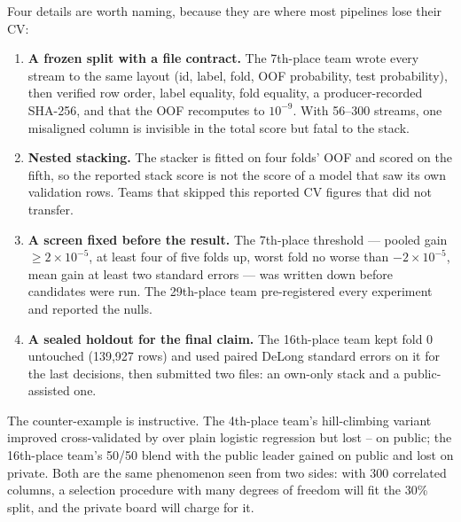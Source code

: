 Four details are worth naming, because they are where most pipelines lose their CV:

\begin{enumerate}
  \item \textbf{A frozen split with a file contract.} The 7th-place team wrote every stream
        to the same layout (id, label, fold, OOF probability, test probability), then
        verified row order, label equality, fold equality, a producer-recorded SHA-256, and
        that the OOF \auc{} recomputes to $10^{-9}$. With 56--300 streams, one misaligned
        column is invisible in the total score but fatal to the stack.
  \item \textbf{Nested stacking.} The stacker is fitted on four folds' OOF and scored on
        the fifth, so the reported stack score is not the score of a model that saw its own
        validation rows. Teams that skipped this reported CV figures that did not transfer.
  \item \textbf{A screen fixed before the result.} The 7th-place threshold --- pooled gain
        $\ge 2\times10^{-5}$, at least four of five folds up, worst fold no worse than
        $-2\times10^{-5}$, mean gain at least two standard errors --- was written down
        before candidates were run. The 29th-place team pre-registered every experiment and
        reported the nulls.
  \item \textbf{A sealed holdout for the final claim.} The 16th-place team kept fold 0
        untouched (139{,}927 rows) and used paired DeLong standard errors
        \citep{deLong1988} on it for the last decisions, then submitted two files: an
        own-only stack and a public-assisted one.
\end{enumerate}

The counter-example is instructive. The 4th-place team's hill-climbing variant improved
cross-validated \auc{} by  over plain logistic regression but lost --
on public; the 16th-place team's 50/50 blend with the public leader gained  on
public and lost  on private. Both are the same phenomenon seen from two sides: with
300 correlated columns, a selection procedure with many degrees of freedom will fit the
30\% split, and the private board will charge for it.
